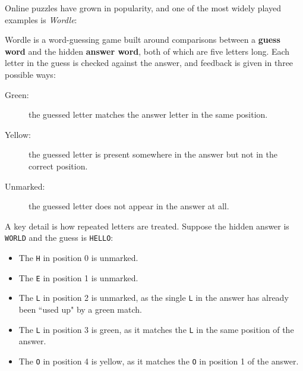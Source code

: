 Online puzzles have grown in popularity, and one of the most widely played examples is {\em Wordle}:


\noindent Wordle is a word-guessing game built around comparisons between a {\bf guess word} and the hidden {\bf answer word}, 
both of which are five letters long. Each letter in the guess is checked against the answer, and feedback is given in three possible ways:
\vspace{6pt}
\begin{description}
   \item [Green:]the guessed letter matches the answer letter in the same position. 
   \item [Yellow:]the guessed letter is present somewhere in the answer but not in the correct position. 
   \item [Unmarked:]the guessed letter does not appear in the answer at all.
\end{description}

\vspace{6pt}

\noindent A key detail is how repeated letters are treated. Suppose the hidden answer is \verb+WORLD+ and the guess is \verb+HELLO+:
\begin{center}
\end{center}
\begin{itemize}
   \item The \verb+H+ in position 0 is unmarked.
   \item The \verb+E+ in position 1 is unmarked.
   \item The \verb+L+ in position 2 is unmarked, as the single \verb+L+ in the answer has already been ``used up" by a green match.
   \item The \verb+L+ in position 3 is green, as it matches the \verb+L+ in the same position of the answer.
   \item The \verb+O+ in position 4 is yellow, as it matches the \verb+O+ in position 1 of the answer.
\end{itemize}
\vspace{6pt}

